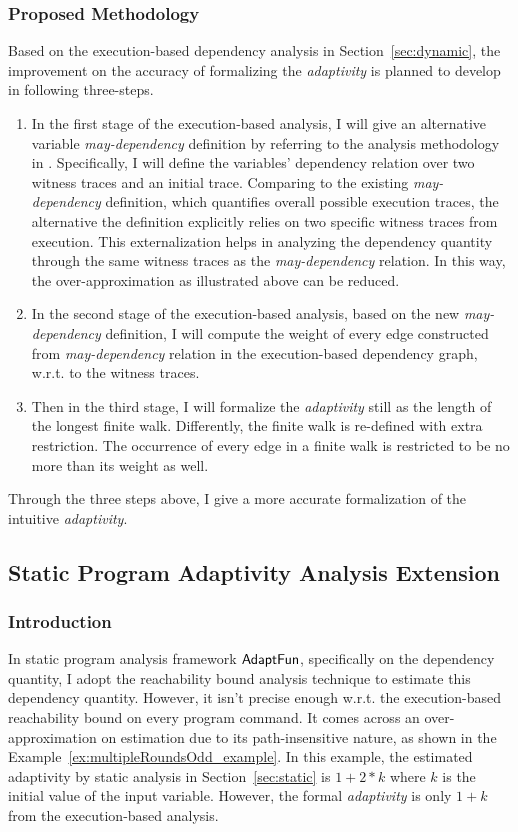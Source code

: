 \subsubsection{Proposed Methodology}
\label{subsubsec:furthers-dep-depth}
% 
Based on the execution-based dependency analysis in Section~\ref{sec:dynamic}, the improvement on the accuracy 
of formalizing the
\emph{adaptivity} is planned to develop in following three-steps.
\begin{enumerate}
\item In the first stage of the execution-based analysis, 
I will give an alternative variable \emph{may-dependency} definition 
by referring to the analysis methodology in \cite{Cousot19a}.
%
Specifically, I will define the variables' dependency relation over two witness traces and an initial trace. Comparing to 
the existing \emph{may-dependency} definition, which quantifies overall possible execution traces, the alternative
the definition explicitly relies on two specific witness traces from execution.
This externalization helps in analyzing the dependency quantity through the same 
witness traces as the \emph{may-dependency} relation. In this way, the over-approximation as illustrated above
can be reduced.
%
\item In the second stage of the execution-based analysis, 
based on the new \emph{may-dependency} definition,
I will compute the weight of every edge constructed from 
\emph{may-dependency} relation in the execution-based dependency graph, w.r.t. to the witness traces.
%
\item Then in the third stage, I will formalize the \emph{adaptivity} still as the 
length of the longest finite walk. Differently, the finite walk is re-defined 
with extra restriction.
The occurrence of every edge in a finite walk is restricted to be no more than its weight as well.
\end{enumerate}
Through the three steps above, I give a more accurate formalization of the intuitive \emph{adaptivity}.
%
\subsection{Static Program Adaptivity Analysis Extension}
\label{subsec:furthers-reachability}
\subsubsection{Introduction}
\label{sec:furthers-static-intro}
In static program analysis framework $\textsf{AdaptFun}$, specifically on the dependency quantity, 
I adopt the reachability bound analysis technique to estimate this dependency quantity.
However, it isn't precise enough w.r.t. the execution-based reachability bound on every program command.
It comes across an over-approximation on estimation due to its path-insensitive nature,
as shown in the Example~\ref{ex:multipleRoundsOdd_example}.
In this example, the estimated adaptivity by static analysis in Section~\ref{sec:static} 
is $1 + 2*k$ where $k$ is the initial value of the input variable.
However, the formal \emph{adaptivity} is only $1 + k$ from the execution-based analysis.

